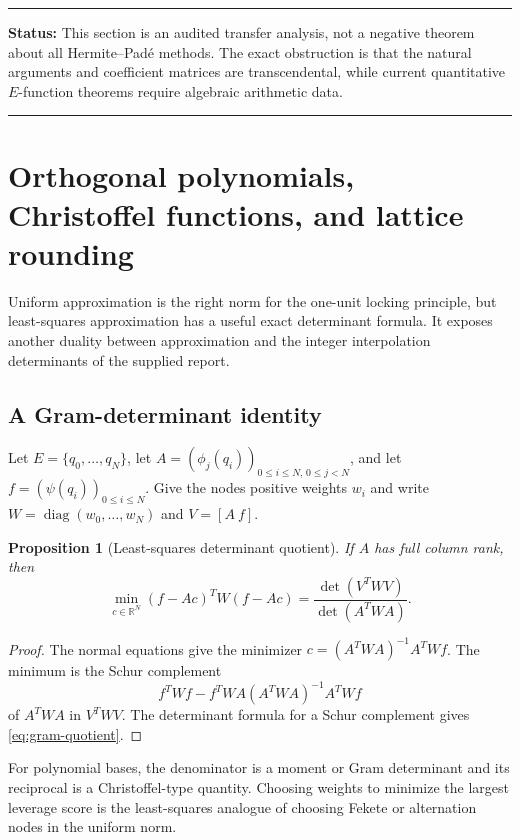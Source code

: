 \documentclass[11pt,oneside]{article}
\newtheorem{proposition}[theorem]{Proposition}
\theoremstyle{definition}
\theoremstyle{remark}
\newcommand{\R}{\mathbb R}
\newenvironment{statusbox}[1]
{\begin{center}\begin{minipage}{0.94\textwidth}\raggedright\hrule\vspace{0.45em}\textbf{Status:} #1\par\vspace{0.35em}}
{\vspace{0.35em}\hrule\end{minipage}\end{center}}
\begin{document}
\begin{statusbox}{This section is an audited transfer analysis, not a negative theorem about
all Hermite--Pad\'e methods.  The exact obstruction is that the natural arguments and
coefficient matrices are transcendental, while current quantitative $E$-function theorems
require algebraic arithmetic data.}
\end{statusbox}


\section{Orthogonal polynomials, Christoffel functions, and lattice rounding}
\label{sec:orthogonal}

Uniform approximation is the right norm for the one-unit locking principle, but least-squares
approximation has a useful exact determinant formula.  It exposes another duality between
approximation and the integer interpolation determinants of the supplied report.

\subsection{A Gram-determinant identity}

Let $E=\{q_0,\ldots,q_N\}$, let
$A=(\phi_j(q_i))_{0\le i\le N,\,0\le j<N}$, and let
$f=(\psi(q_i))_{0\le i\le N}$.  Give the nodes positive weights
$w_i$ and write $W=\operatorname{diag}(w_0,\ldots,w_N)$ and $V=[A\ f]$.

\begin{proposition}[Least-squares determinant quotient]
\label{prop:gram-quotient}
If $A$ has full column rank, then
\begin{equation}
 \min_{c\in\R^N}(f-Ac)^TW(f-Ac)
 =\frac{\det(V^TWV)}{\det(A^TWA)}.
 \label{eq:gram-quotient}
\end{equation}
\end{proposition}

\begin{proof}
The normal equations give the minimizer
$c=(A^TWA)^{-1}A^TWf$.  The minimum is the Schur complement
\[
 f^TWf-f^TWA(A^TWA)^{-1}A^TWf
\]
of $A^TWA$ in $V^TWV$.  The determinant formula for a Schur complement gives
\eqref{eq:gram-quotient}.
\end{proof}

For polynomial bases, the denominator is a moment or Gram determinant and its reciprocal is a
Christoffel-type quantity.  Choosing weights to minimize the largest leverage score is the
least-squares analogue of choosing Fekete or alternation nodes in the uniform norm.
\end{document}
